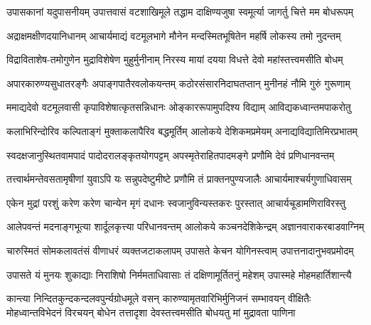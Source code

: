 

\begin{AutoCols}[\maxColumns]
\fourlineindentedshloka
{उपासकानां यदुपासनीयम्}
{उपात्तवासं वटशाखिमूले}
{तद्धाम दाक्षिण्यजुषा स्वमूर्त्या}
{जागर्तु चित्ते मम बोधरूपम्}

\fourlineindentedshloka
{अद्राक्षमक्षीणदयानिधानम्}
{आचार्यमाद्यं वटमूलभागे}
{मौनेन मन्दस्मितभूषितेन}
{महर्षि लोकस्य तमो नुदन्तम्}

\fourlineindentedshloka
{विद्राविताशेष-तमोगुणेन}
{मुद्राविशेषेण मुहुर्मुनीनाम्}
{निरस्य मायां दयया विधत्ते}
{देवो महांस्तत्त्वमसीति बोधम्}

\fourlineindentedshloka
{अपारकारुण्यसुधातरङ्गैः}
{अपाङ्गपातैरवलोकयन्तम्}
{कठोरसंसारनिदाघतप्तान्}
{मुनीनहं नौमि गुरुं गुरूणाम्}

\fourlineindentedshloka
{ममाद्यदेवो वटमूलवासी}
{कृपाविशेषात्कृतसन्निधानः}
{ओङ्काररूपामुपदिश्य विद्याम्}
{आविद्यकध्वान्तमपाकरोतु}

\fourlineindentedshloka
{कलाभिरिन्दोरिव कल्पिताङ्गं}
{मुक्ताकलापैरिव बद्धमूर्तिम्}
{आलोकये देशिकमप्रमेयम्}
{अनाद्यविद्यातिमिरप्रभातम्}

\fourlineindentedshloka
{स्वदक्षजानुस्थितवामपादं}
{पादोदरालङ्कृतयोगपट्टम्}
{अपस्मृतेराहितपादमङ्गे}
{प्रणौमि देवं प्रणिधानवन्तम्}

\fourlineindentedshloka
{तत्त्वार्थमन्तेवसतामृषीणां}
{युवाऽपि यः सन्नुपदेष्टुमीष्टे}
{प्रणौमि तं प्राक्तनपुण्यजालैः}
{आचार्यमाश्चर्यगुणाधिवासम्}

\fourlineindentedshloka
{एकेन मुद्रां परशुं करेण}
{करेण चान्येन मृगं दधानः}
{स्वजानुविन्यस्तकरः पुरस्तात्}
{आचार्यचूडामणिराविरस्तु}

\fourlineindentedshloka
{आलेपवन्तं मदनाङ्गभूत्या}
{शार्दूलकृत्त्या परिधानवन्तम्}
{आलोकये कञ्चनदेशिकेन्द्रम्}
{अज्ञानवाराकरबाडवाग्निम्}

\fourlineindentedshloka
{चारुस्मितं सोमकलावतंसं}
{वीणाधरं व्यक्तजटाकलापम्}
{उपासते केचन योगिनस्त्वाम्}
{उपात्तनादानुभवप्रमोदम्}

\fourlineindentedshloka
{उपासते यं मुनयः शुकाद्याः}
{निराशिषो निर्ममताधिवासाः}
{तं दक्षिणामूर्तितनुं महेशम्}
{उपास्महे मोहमहार्तिशान्त्यै}
\end{AutoCols}

\fourlineindentedshloka
{कान्त्या निन्दितकुन्दकन्दलवपुर्न्यग्रोधमूले वसन्}
{कारुण्यामृतवारिभिर्मुनिजनं सम्भावयन् वीक्षितैः}
{मोहध्वान्तविभेदनं विरचयन् बोधेन तत्तादृशा}
{देवस्तत्त्वमसीति बोधयतु मां मुद्रावता पाणिना}

